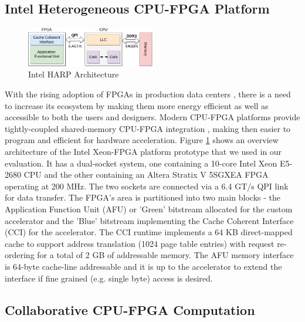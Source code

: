 \subsection{Intel Heterogeneous CPU-FPGA Platform}

\begin{figure}[htbp]
\centering
\includegraphics[width=0.5\textwidth]{figures/harp_arch}
\caption{Intel HARP Architecture}
\label{fig:harp_arch}
\end{figure}

With the rising adoption of FPGAs in production data centers \cite{Catapult}, there is a need to increase its ecosystem by making them more energy efficient as well as accessible to both the users and designers. Modern CPU-FPGA platforms \cite{CPU-FPGA} provide tightly-coupled shared-memory CPU-FPGA integration \cite{CAPI} \cite{CCI}, making then easier to program and efficient for hardware acceleration. Figure \ref{fig:harp_arch} shows an overview architecture of the Intel Xeon-FPGA platform prototype that we used in our evaluation. It has a dual-socket system, one containing a 10-core Intel Xeon E5-2680 CPU and the other containing an Altera Stratix V 5SGXEA FPGA operating at 200 MHz. The two sockets are connected via a 6.4 GT/s QPI \cite{QPI} link for data transfer. The FPGA's area is partitioned into two main blocks - the Application Function Unit (AFU) or 'Green' bitstream allocated for the custom accelerator and the 'Blue' bitstream implementing the Cache Coherent Interface (CCI) for the accelerator. The CCI runtime implements a 64 KB direct-mapped cache to support address translation (1024 page table entries) with request re-ordering for a total of 2 GB of addressable memory. The AFU memory interface is 64-byte cache-line addressable and it is up to the accelerator to extend the interface if fine grained (e.g. single byte) access is desired.

\subsection{Collaborative CPU-FPGA Computation}

